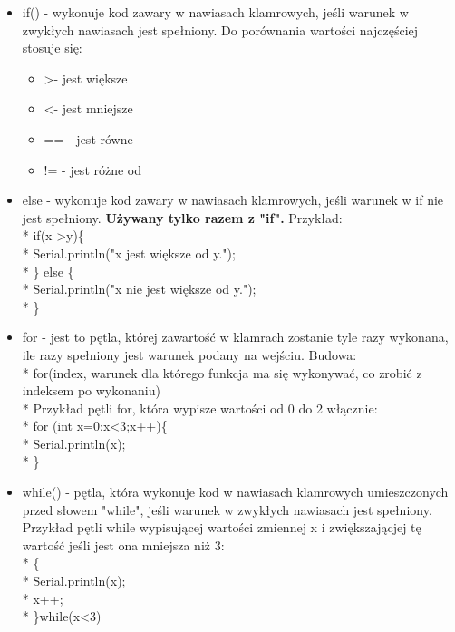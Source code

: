 	\begin{itemize}
		\item if(){} - wykonuje kod zawary w nawiasach klamrowych, jeśli warunek w zwykłych nawiasach jest spełniony. Do porównania wartości najczęściej stosuje się:
			\begin{itemize}
				\item \textgreater  - jest większe
				\item \textless  - jest mniejsze
				\item == - jest równe
				\item != - jest różne od
			\end{itemize}
		\item else - wykonuje kod zawary w nawiasach klamrowych, jeśli warunek w if nie jest spełniony. \textbf{Używany tylko razem z "if".} Przykład:\\*
		if(x \textgreater y)\{\\*
		\indent	Serial.println("x jest większe od y.");\\*
		\} else \{\\*
		\indent	Serial.println("x nie jest większe od y.");\\*
		\}
		\item for - jest to pętla, której zawartość w klamrach zostanie tyle razy wykonana, ile razy spełniony jest warunek podany na wejściu. Budowa:\\*
		for(index, warunek dla którego funkcja ma się wykonywać, co zrobić z indeksem po wykonaniu){}\\*
		Przykład pętli for, która wypisze wartości od 0 do 2 włącznie:\\*
		for (int x=0;x<3;x++)\{\\*
			Serial.println(x);\\*
		\}
		\item while() - pętla, która wykonuje kod w nawiasach klamrowych umieszczonych przed słowem "while", jeśli warunek w zwykłych nawiasach jest spełniony. 
		Przykład pętli while wypisującej wartości zmiennej x i zwiększającjej tę wartość jeśli jest ona mniejsza niż 3:\\*
		\{\\*
		\indent	Serial.println(x);\\*
		\indent	x++;\\*
		\}while(x<3)
	\end{itemize}
%	  

